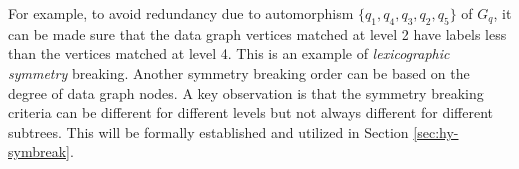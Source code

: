 For example, to avoid redundancy due to automorphism $\{q_1, q_4, q_3, q_2, q_5\}$ of $G_q$, it can be made sure that the data graph vertices matched at level 2 have labels less than the vertices matched at level 4. This is an example of \textit{lexicographic symmetry} breaking.
Another symmetry breaking order can be based on the degree of data graph nodes.
A key observation is that the symmetry breaking criteria can be different for different levels but not always different for different subtrees.
This will be formally established and utilized in Section \ref{sec:hy-symbreak}.




